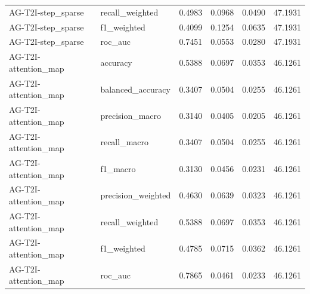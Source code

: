 \begin{tabular}{llrrrr}
AG-T2I-step_sparse & recall_weighted & 0.4983 & 0.0968 & 0.0490 & 47.1931 \\
AG-T2I-step_sparse & f1_weighted & 0.4099 & 0.1254 & 0.0635 & 47.1931 \\
AG-T2I-step_sparse & roc_auc & 0.7451 & 0.0553 & 0.0280 & 47.1931 \\
AG-T2I-attention_map & accuracy & 0.5388 & 0.0697 & 0.0353 & 46.1261 \\
AG-T2I-attention_map & balanced_accuracy & 0.3407 & 0.0504 & 0.0255 & 46.1261 \\
AG-T2I-attention_map & precision_macro & 0.3140 & 0.0405 & 0.0205 & 46.1261 \\
AG-T2I-attention_map & recall_macro & 0.3407 & 0.0504 & 0.0255 & 46.1261 \\
AG-T2I-attention_map & f1_macro & 0.3130 & 0.0456 & 0.0231 & 46.1261 \\
AG-T2I-attention_map & precision_weighted & 0.4630 & 0.0639 & 0.0323 & 46.1261 \\
AG-T2I-attention_map & recall_weighted & 0.5388 & 0.0697 & 0.0353 & 46.1261 \\
AG-T2I-attention_map & f1_weighted & 0.4785 & 0.0715 & 0.0362 & 46.1261 \\
AG-T2I-attention_map & roc_auc & 0.7865 & 0.0461 & 0.0233 & 46.1261 \\
\bottomrule
\end{tabular}
